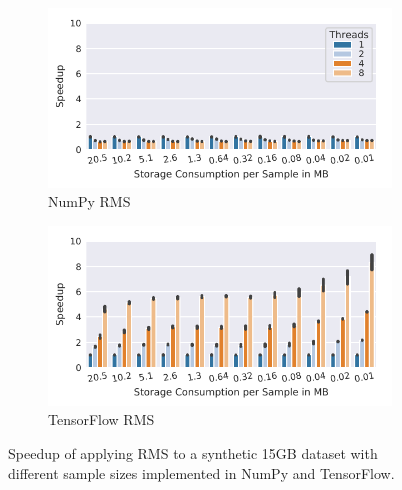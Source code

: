 {\color{diff2}
\vspace{-0.3cm}
\begin{figure}[h]
    \begin{subfigure}[c]{0.23\textwidth}
        \includegraphics[width=\textwidth]{figures/misc/artificial-dataset-speedup-np-raw.pdf}
        \vspace{-18pt}
        \caption{NumPy RMS}
        \label{fig:synthetic-dataset-processing-np}
    \end{subfigure}
    \begin{subfigure}[c]{0.23\textwidth}
        \includegraphics[width=\textwidth]{figures/misc/artificial-dataset-speedup-tf-raw.pdf}
        \vspace{-18pt}
        \caption{TensorFlow RMS}
        \label{fig:synthetic-dataset-processing-tf}
    \end{subfigure}
    \vspace*{-0.3cm}
    \caption{{\color{diff2}Speedup of applying RMS to a synthetic 15\:GB dataset with different sample sizes implemented in NumPy and TensorFlow. }}
    \label{fig:synthetic-dataset-tf-vs-np}
\end{figure}
\vspace{-0.3cm}

}
